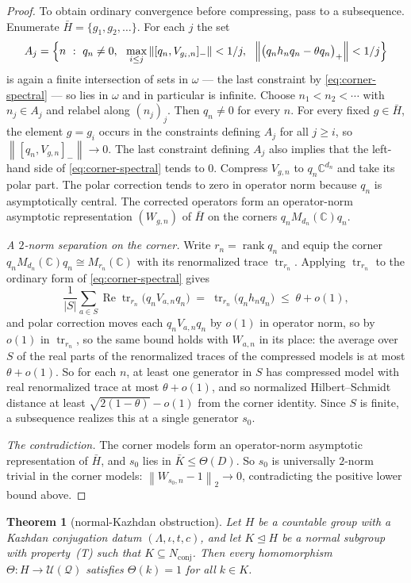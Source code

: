 \documentclass[11pt]{amsart}
\newcommand{\leanverified}[2]{\ignorespaces}
\newtheorem{theorem}{Theorem}[section]
\theoremstyle{definition}
\theoremstyle{remark}
\theoremstyle{plain}
\newcommand{\C}{\mathbb C}
\newcommand{\U}{\mathcal U}
\newcommand{\tr}{\operatorname{tr}}
\newcommand{\opnorm}[1]{\left\lVert #1\right\rVert}
\newcommand{\hsnorm}[1]{\left\lVert #1\right\rVert_{2}}
\begin{document}
\begin{proof}
To obtain ordinary convergence before compressing, pass to a
subsequence.  Enumerate
$\bar H=\{g_1,g_2,\dots\}$.  For each $j$ the set
\[
 A_j=\Bigl\{n\ :\ q_n\ne0,\ \ \max_{i\le j}\opnorm{[q_n,V_{g_i,n}]_{-}}<1/j,\ \
 \opnorm{\bigl(q_nh_nq_n-\theta q_n\bigr)_{+}}<1/j\Bigr\}
\]
is again a finite intersection of sets in $\omega$ --- the last
constraint by \eqref{eq:corner-spectral} --- so lies in $\omega$ and
in particular is infinite.  Choose $n_1<n_2<\cdots$ with $n_j\in A_j$
and relabel along $(n_j)_j$.  Then $q_n\ne0$ for every $n$.  For every
fixed $g\in\bar H$, the element $g=g_i$ occurs in the constraints
defining $A_j$ for all $j\ge i$, so
$\opnorm{[q_n,V_{g,n}]_{-}}\to0$.  The last constraint defining $A_j$
also implies that the left-hand side of \eqref{eq:corner-spectral}
tends to $0$.  Compress $V_{g,n}$ to $q_n\mathbb C^{d_n}$ and take its
polar part.  The polar correction tends to zero in operator norm because
$q_n$ is asymptotically central.  The corrected operators form an
operator-norm asymptotic representation $(W_{g,n})$ of $\bar H$ on the
corners $q_nM_{d_n}(\C)q_n$.

\emph{A $2$-norm separation on the corner.}  Write
$r_n=\operatorname{rank}q_n$ and equip the corner
$q_nM_{d_n}(\C)q_n\cong M_{r_n}(\C)$ with its renormalized trace
$\tr_{r_n}$.  Applying $\tr_{r_n}$ to the ordinary form of
\eqref{eq:corner-spectral} gives
\[
 \frac1{|S|}\sum_{a\in S}\operatorname{Re}\tr_{r_n}\bigl(q_nV_{a,n}q_n\bigr)
 \;=\;\tr_{r_n}\bigl(q_nh_nq_n\bigr)\;\le\;\theta+o(1),
\]
and polar correction moves each $q_nV_{a,n}q_n$ by $o(1)$ in operator
norm, so by $o(1)$ in $\tr_{r_n}$, so the same bound holds with
$W_{a,n}$ in its place: the average over $S$
of the real parts of the renormalized traces of the compressed models
is at most $\theta+o(1)$.  So for each $n$, at least one generator in
$S$ has compressed model with real renormalized trace at
most $\theta+o(1)$, and so normalized Hilbert--Schmidt distance at
least $\sqrt{2(1-\theta)}-o(1)$ from the corner identity.  Since $S$
is finite, a subsequence realizes this at a single generator $s_0$.

\emph{The contradiction.}  The corner models form an operator-norm
asymptotic representation of $\bar H$, and $s_0$ lies in
$\bar K\le\Theta(D)$.  So $s_0$ is universally $2$-norm trivial in the corner
models: $\hsnorm{W_{s_0,n}-1}\to0$, contradicting the positive lower
bound above.
\end{proof}

\begin{theorem}[normal-Kazhdan obstruction]\label{thm:normal-kazhdan}
Let $H$ be a countable group with a Kazhdan conjugation datum
$(\Lambda,\iota,t,c)$, and let $K\trianglelefteq H$ be a normal
subgroup with property~\textup{(T)} such that
$K\subseteq N_{\mathrm{conj}}$.  Then every homomorphism $\Theta\colon H\to\U(\mathcal Q)$ satisfies $\Theta(k)=1$ for all
$k\in K$.
\leanverified{Sofic/NormalKazhdanAnyUniverse}{GroupApproximation.ManuscriptExactWrappers.manuscriptNormalKazhdanObstruction_anyUniverse}
\end{theorem}
\end{document}

